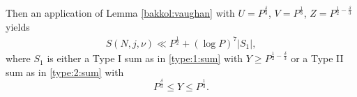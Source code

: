 \documentclass[a4paper,10pt]{amsart}
\numberwithin{equation}{section}
\theoremstyle{definition}
\theoremstyle{remark}
\newcommand{\lf}{\left\lfloor}
\newcommand{\rf}{\right\rfloor}
\renewcommand{\lvert}{\left\vert}
\renewcommand{\rvert}{\right\vert}
\begin{document}


Then an application of Lemma \ref{bakkol:vaughan} with $U=P^{\frac\delta3}$,
$V=P^{\frac13}$, $Z=P^{\frac12-\frac\delta3}$ yields 
\begin{align}\label{mani:afterVaughan}
S(N,j,\nu)\ll P^{\frac12}+\left(\log P\right)^7\lvert S_1\rvert,
\end{align}
where $S_1$ is either a Type I sum as in \eqref{type:1:sum} with
$Y\geq P^{\frac12-\frac\delta3}$ or a Type II sum as in \eqref{type:2:sum} with
\[
P^{\frac\delta3}\leq Y\leq P^{\frac13}.
\]

\end{document}
